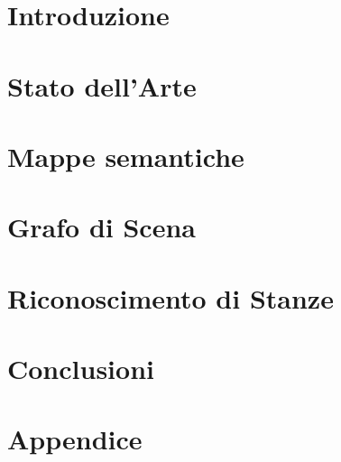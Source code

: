 \documentclass[a4paper, oneside]{book}
\author{Luca Brini}
\newcommand\myemptypage{
    \null
    \thispagestyle{empty}
    \addtocounter{page}{-1}
    \newpage
    }
\begin{document}

\myemptypage



\frontmatter
\tableofcontents

\mainmatter
\chapter*{Introduzione}



\chapter{Stato dell'Arte}


\chapter{Mappe semantiche}



\chapter{Grafo di Scena}\label{chap:grafo_di_scena}



\chapter{Riconoscimento di Stanze}\label{chap:riconoscimento_stanze}



\chapter{Conclusioni}



\printbibliography

\appendix
\chapter{Appendice}




\printnoidxglossaries

\listoffigures
{}
\listoftables
\end{document}
